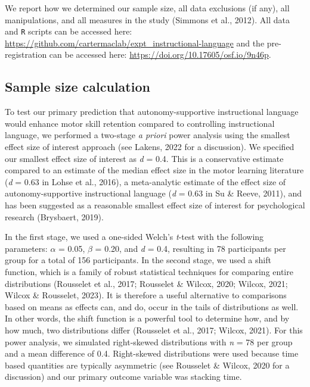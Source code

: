 \documentclass[
  doc, donotrepeattitle,floatsintext]{apa7}
\begin{document}
We report how we determined our sample size, all data exclusions (if any), all manipulations, and all measures in the study (Simmons et al., 2012). All data and \texttt{R} scripts can be accessed here: \url{https://github.com/cartermaclab/expt_instructional-language} and the pre-registration can be accessed here: \url{https://doi.org/10.17605/osf.io/9n46p}.

\hypertarget{sample-size-calculation}{%
\subsection{Sample size calculation}\label{sample-size-calculation}}

To test our primary prediction that autonomy-supportive instructional language would enhance motor skill retention compared to controlling instructional language, we performed a two-stage \emph{a priori} power analysis using the smallest effect size of interest approach (see Lakens, 2022 for a discussion). We specified our smallest effect size of interest as \emph{d} = 0.4. This is a conservative estimate compared to an estimate of the median effect size in the motor learning literature (\emph{d} = 0.63 in Lohse et al., 2016), a meta-analytic estimate of the effect size of autonomy-supportive instructional language (\emph{d} = 0.63 in Su \& Reeve, 2011), and has been suggested as a reasonable smallest effect size of interest for psychological research (Brysbaert, 2019).

In the first stage, we used a one-sided Welch's \emph{t}-test with the following parameters: \(\alpha\) = 0.05, \(\beta\) = 0.20, and \emph{d} = 0.4, resulting in 78 participants per group for a total of 156 participants. In the second stage, we used a shift function, which is a family of robust statistical techniques for comparing entire distributions (Rousselet et al., 2017; Rousselet \& Wilcox, 2020; Wilcox, 2021; Wilcox \& Rousselet, 2023). It is therefore a useful alternative to comparisons based on means as effects can, and do, occur in the tails of distributions as well. In other words, the shift function is a powerful tool to determine how, and by how much, two distributions differ (Rousselet et al., 2017; Wilcox, 2021). For this power analysis, we simulated right-skewed distributions with \emph{n} = 78 per group and a mean difference of 0.4. Right-skewed distributions were used because time based quantities are typically asymmetric (see Rousselet \& Wilcox, 2020 for a discussion) and our primary outcome variable was stacking time.
\end{document}
